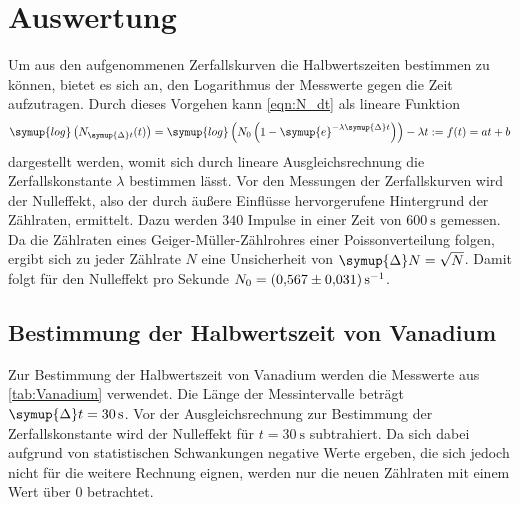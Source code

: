 \section{Auswertung}
\label{sec:Auswertung}
Um aus den aufgenommenen Zerfallskurven die Halbwertszeiten bestimmen zu können, bietet es sich an, den Logarithmus der Messwerte gegen die Zeit aufzutragen.
Durch dieses Vorgehen kann \autoref{eqn:N_dt} als lineare Funktion 
\begin{equation}
  \label{eqn:linear}
  \symup{log}\left(N_{\symup{\Delta}t}(t) \right) = \symup{log}\left(N_0 \left(1- \symup{e}^{-\lambda \symup{\Delta}t}\right)\right) - \lambda t := f(t) = at + b
\end{equation}
dargestellt werden, womit sich durch lineare Ausgleichsrechnung die Zerfallskonstante $\lambda$ bestimmen lässt.
Vor den Messungen der Zerfallskurven wird der Nulleffekt, also der durch äußere Einflüsse hervorgerufene Hintergrund der Zählraten, ermittelt. Dazu werden $\num{340}$
Impulse in einer Zeit von $\qty{600}{\second}$ gemessen. Da die Zählraten eines Geiger-Müller-Zählrohres einer Poissonverteilung folgen, ergibt sich zu jeder Zählrate 
$N$ eine Unsicherheit von $\symup{\Delta}N = \sqrt{N}$. Damit folgt für den Nulleffekt pro Sekunde $N_0 = \qty{0.567+-0.031}{\second^{-1}}$.

\subsection{Bestimmung der Halbwertszeit von Vanadium}
\label{subsec:A_Vanadium}
Zur Bestimmung der Halbwertszeit von Vanadium werden die Messwerte aus \autoref{tab:Vanadium} verwendet. Die Länge der Messintervalle beträgt 
$\symup{\Delta}t = \qty{30}{\second}$. Vor der Ausgleichsrechnung zur Bestimmung der Zerfallskonstante wird der Nulleffekt für $t = \qty{30}{\second}$ subtrahiert.
Da sich dabei aufgrund von statistischen Schwankungen negative Werte ergeben, die sich jedoch nicht für die weitere Rechnung eignen, werden nur die neuen Zählraten
mit einem Wert über $0$ betrachtet.

